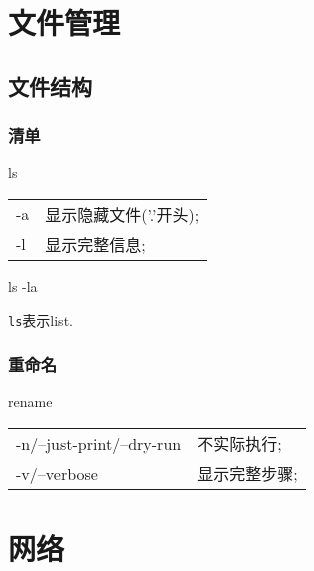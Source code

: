 \documentclass[hidelinks]{ctexart}
\begin{document}

\section{文件管理} %
\label{sec:文件管理}

\subsection{文件结构} %
\label{sub:文件结构}

\subsubsection{清单} %
\label{ssub:清单}

\begin{shcommand}{ls}
\ttfamily
\begin{tabular}{@{$\bullet\quad$}ll}
   -a      & 显示隐藏文件('.'开头); \\
   -l & 显示完整信息; \\
\end{tabular} 
\end{shcommand}
\begin{shlst}
ls -la
\end{shlst}

\texttt{ls}表示list.


\subsubsection{重命名} %
\label{ssub:重命名}

\begin{shcommand}{rename}
\ttfamily
\begin{tabular}{@{$\bullet\quad$}ll}
   -n/--just-print/--dry-run      & 不实际执行; \\
   -v/--verbose & 显示完整步骤; \\
\end{tabular} 
\end{shcommand}




\section{网络} %
\label{sec:网络}
\end{document}
